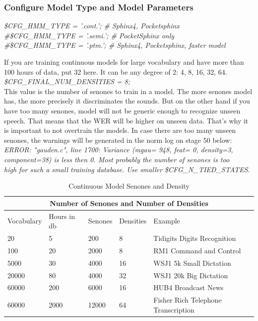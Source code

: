 \documentclass[12pt,a4paper,oldfontcommands]{memoir}
\begin{document}
\subsubsection{Configure Model Type and Model Parameters}
\textit{
\$CFG\_HMM\_TYPE = '.cont.'; \# Sphinx4, Pocketsphinx\\
\#\$CFG\_HMM\_TYPE  = '.semi.'; \# PocketSphinx only\\
\#\$CFG\_HMM\_TYPE  = '.ptm.'; \# Sphinx4, Pocketsphinx, faster model\\
}


If you are training continuous models for large vocabulary and have more than 100 hours of data, put 32 here. It can be any degree of 2: 4, 8, 16, 32, 64. 
\textit{\$CFG\_FINAL\_NUM\_DENSITIES = 8;}\\

This value is the number of senones to train in a model. The more senones model has, the more precisely it discriminates the sounds. But on the other hand if you have too many senones, model will not be generic enough to recognize unseen speech. That means that the WER will be higher on unseen data. That's why it is important to not overtrain the models. In case there are too many unseen senones, the warnings will be generated in the norm log on stage 50 below: 
\textit{
ERROR: "gauden.c", line 1700: Variance (mgau= 948, feat= 0, density=3, \\
component=38) is less then 0. Most probably the number of senones is too\\
high for such a small training database. Use smaller \$CFG\_N\_TIED\_STATES.}

\begin{table}
\centering
\caption{Continuous Model Senones and Density}
\begin{tabular}
{ |p{2cm}||p{2cm}|p{2cm}|p{2cm}|p{3cm}|  }
 \hline

 \multicolumn{5}{|c|}{Number of Senones and Number of Densities} \\
 \hline
 Vocabulary  &  Hours in db  & Senones &  Densities & Example \\
 \hline
 20 &	5    &	200  &	8  &	Tidigits Digits Recognition\\
\hline
100 &	20   &	2000 &	8  &	RM1 Command and Control\\
\hline
5000 &	30   &	4000 &	16 &	WSJ1 5k Small Dictation\\
\hline
20000 &	80   &	4000 &	32 &	WSJ1 20k Big Dictation\\
\hline
60000 &	200  &	6000 &	16 &	HUB4 Broadcast News\\
\hline
60000 &	2000 &	12000 &	64 &	Fisher Rich Telephone Transcription\\

 \hline

\end{tabular}
\end{table}
\end{document}
